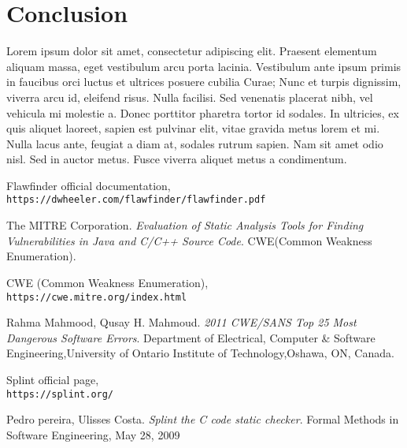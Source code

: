 \documentclass[a4paper,12pt]{article}
\begin{document}
\newpage
\section{Conclusion}
Lorem ipsum dolor sit amet, consectetur adipiscing elit. Praesent elementum aliquam massa, eget vestibulum arcu porta lacinia. Vestibulum ante ipsum primis in faucibus orci luctus et ultrices posuere cubilia Curae; Nunc et turpis dignissim, viverra arcu id, eleifend risus. Nulla facilisi. Sed venenatis placerat nibh, vel vehicula mi molestie a. Donec porttitor pharetra tortor id sodales. In ultricies, ex quis aliquet laoreet, sapien est pulvinar elit, vitae gravida metus lorem et mi. Nulla lacus ante, feugiat a diam at, sodales rutrum sapien. Nam sit amet odio nisl. Sed in auctor metus. Fusce viverra aliquet metus a condimentum.








\begin{thebibliography}{}

   Flawfinder official documentation,\\\texttt{https://dwheeler.com/flawfinder/flawfinder.pdf}

The MITRE Corporation.
\textit{Evaluation of Static Analysis Tools for Finding Vulnerabilities in Java and C/C++
Source Code}.
CWE(Common
Weakness Enumeration)\cite{CWE}.

  CWE (Common
Weakness Enumeration),\\\texttt{https://cwe.mitre.org/index.html}

  
Rahma Mahmood, Qusay H. Mahmoud.
\textit{2011 CWE/SANS Top 25 Most Dangerous Software Errors}.
Department of Electrical, Computer \& Software Engineering,University of Ontario Institute of Technology,Oshawa, ON, Canada.

 Splint official page,\\\texttt{https://splint.org/}    

Pedro pereira, Ulisses Costa.
\textit{Splint the C code static checker}.
Formal Methods in Software Engineering, May 28, 2009
\end{thebibliography}
\end{document}
